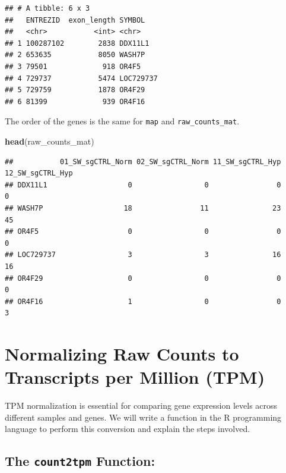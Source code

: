 \documentclass[
]{book}
\newenvironment{Shaded}{\begin{snugshade}}{\end{snugshade}}
\newcommand{\FunctionTok}[1]{\textcolor[rgb]{0.13,0.29,0.53}{\textbf{#1}}}
\newcommand{\NormalTok}[1]{#1}
\begin{document}
\begin{verbatim}
## # A tibble: 6 x 3
##   ENTREZID  exon_length SYMBOL   
##   <chr>           <int> <chr>    
## 1 100287102        2838 DDX11L1  
## 2 653635           8050 WASH7P   
## 3 79501             918 OR4F5    
## 4 729737           5474 LOC729737
## 5 729759           1878 OR4F29   
## 6 81399             939 OR4F16
\end{verbatim}

The order of the genes is the same for \texttt{map} and \texttt{raw\_counts\_mat}.

\begin{Shaded}
\begin{Highlighting}[]
\FunctionTok{head}\NormalTok{(raw\_counts\_mat)}
\end{Highlighting}
\end{Shaded}

\begin{verbatim}
##           01_SW_sgCTRL_Norm 02_SW_sgCTRL_Norm 11_SW_sgCTRL_Hyp 12_SW_sgCTRL_Hyp
## DDX11L1                   0                 0                0                0
## WASH7P                   18                11               23               45
## OR4F5                     0                 0                0                0
## LOC729737                 3                 3               16               16
## OR4F29                    0                 0                0                0
## OR4F16                    1                 0                0                3
\end{verbatim}

\hypertarget{normalizing-raw-counts-to-transcripts-per-million-tpm}{%
\section{Normalizing Raw Counts to Transcripts per Million (TPM)}\label{normalizing-raw-counts-to-transcripts-per-million-tpm}}

TPM normalization is essential for comparing gene expression levels across different samples and genes. We will write a function in the R programming language to perform this conversion and explain the steps involved.

\hypertarget{the-count2tpm-function}{%
\subsection{\texorpdfstring{The \texttt{count2tpm} Function:}{The count2tpm Function:}}\label{the-count2tpm-function}}
\end{document}

